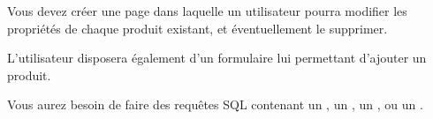 

\vspace*{0.7cm}

\noindent {}

\bigskip


\noindent Vous devez créer une page  dans laquelle un utilisateur pourra modifier les propriétés de chaque produit existant, et éventuellement le supprimer.

\medskip

\noindent L'utilisateur disposera également d'un formulaire lui permettant d'ajouter un produit.

%

\medskip

\noindent Vous aurez besoin de faire des requêtes SQL contenant un , un , un , ou un .

